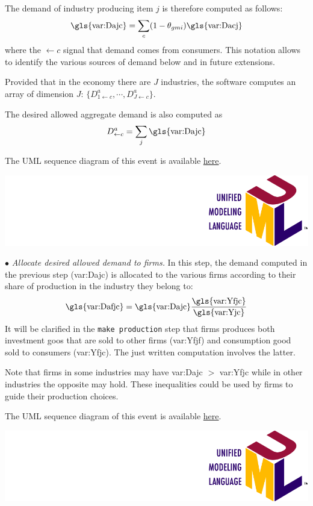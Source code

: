 \documentclass{book}
\newcommand{\doclocation}{file:///Users/giulioni/Documents/workspace/gabriele/docs}
\begin{document}
\vskip3mm
The demand of industry producing item $j$ is therefore computed as follows:
\[
	\textnormal{\gls{var:Dajc}}=\sum_c (1-\theta_{gmi}) \textnormal{\gls{var:Dacj}}
\]
where the $\leftarrow c$ signal that demand comes from consumers. This notation allows to identify the various sources of demand below and in future extensions. 

Provided that in the economy there are $J$ industries, the software computes an array of dimension $J$: $\{D^a_{1\leftarrow c},\cdots,D^a_{J\leftarrow c}\}$.

The desired allowed aggregate demand is also computed as
\[
	D^a_{\leftarrow c}=\sum_j\textnormal{\gls{var:Dajc}}
\]

The UML sequence diagram of this event is available \href{\doclocation/umldoc/computeDesiredDemand.html}{here}.
\begin{marginfigure}
	\includegraphics[scale=0.1]{uml.png}
\end{marginfigure}

\noindent$\bullet$ \textit{Allocate desired allowed demand to firms.} In this step, the demand computed in the previous step (\gls{var:Dajc}) is allocated to the various firms according to their share of production in the industry they belong to:
\begin{equation}
	\textnormal{\gls{var:Dafjc}}=\textnormal{\gls{var:Dajc}}\frac{\textnormal{\gls{var:Yfjc}}}{\textnormal{\gls{var:Yjc}}}
	\label{eq:Dafjc}
\end{equation}
It will be clarified in the \verb+make production+ step that firms produces both investment goos that are sold to other firms (\gls{var:Yfjf}) and consumption good sold to consumers (\gls{var:Yfjc}). The just written computation involves the latter.

Note that firms in some industries may have \gls{var:Dajc} $>$ \gls{var:Yfjc} while in other industries the opposite may hold. These inequalities could be used by firms to guide their production choices.

The UML sequence diagram of this event is available \href{\doclocation/umldoc/allocateDesiredDemand.html}{here}.
\begin{marginfigure}
	\includegraphics[scale=0.1]{uml.png}
\end{marginfigure}
\end{document}
